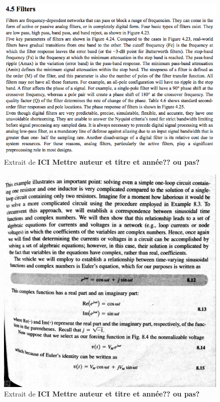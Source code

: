 \begin{figure}
\begin{center}
\includegraphics[scale=0.7]{img/Kularatna-1}
\end{center}
\caption{Extrait de \cite[p.~249-251]{Kularatna}\textbf{ICI Mettre auteur et titre et année?? ou pas?}} %
\label{Trace 5}
\end{figure}

\begin{figure}
\begin{center}
\includegraphics[scale=0.5]{img/Irwin-1}
\end{center}
\caption{Extrait de \cite[p.~375]{Irwin}\textbf{ICI Mettre auteur et titre et année?? ou pas?}}%
\label{Trace 6}
\end{figure}

